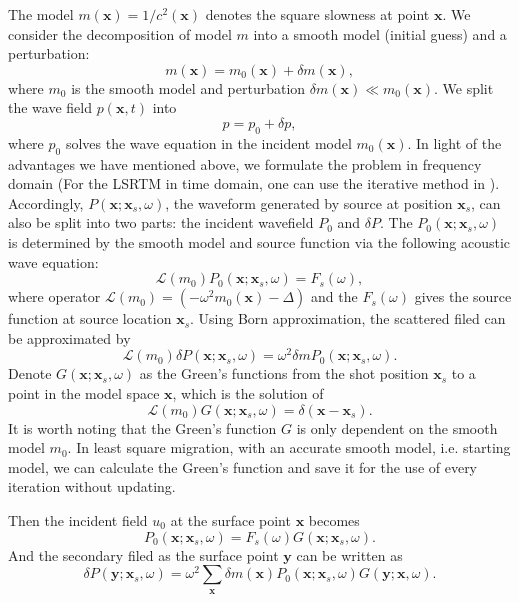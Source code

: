 \documentclass[11pt]{article}
\newcommand{\cL}{\mathcal{L}}
\newcommand{\bx}{\boldsymbol{x}}
\newcommand{\by}{\boldsymbol{y}}
\theoremstyle{plain}
\theoremstyle{definition}
\theoremstyle{remark}
\numberwithin{equation}{section}
\begin{document}
The model $m(\bx)=1/c^2(\bx)$ denotes the square slowness at point $\bx$. 
We consider the decomposition of model $m$ into a smooth model (initial guess) and a perturbation:
\begin{equation}
m(\bx)=m_0(\bx)+\delta m(\bx),
\end{equation} 
where $m_0$ is the smooth model and perturbation $\delta m(\bx) \ll m_0(\bx)$. We split the wave field $p(\bx,t)$ into 
\begin{equation}
p=p_0+\delta p,
\end{equation}
where $p_0$ solves the wave equation in the incident model $m_0(\bx)$.
In light of the advantages we have mentioned above, we formulate the problem in frequency domain (For the LSRTM in time domain, one can use the iterative method in \cite{Dong:2012aa}).
Accordingly, $P(\bx;\bx_s, \omega)$, the waveform generated by source at position $\bx_s$, can also be split into two parts: the incident wavefield $P_0$
and $\delta P$. The $P_0(\bx; \bx_s, \omega)$ is determined by the smooth model and source function via the following acoustic wave equation:
\begin{equation}
\cL( m_0) P_0(\bx; \bx_s, \omega)=F_s(\omega),
\end{equation} 
where operator $\cL( m_0)=(-\omega^2 m_0(\bx)-\Delta)$ and the $F_s(\omega)$ gives the source function at source location $\bx_s$. 
Using Born approximation, the scattered filed can be approximated by  
\begin{equation}
\cL( m_0)\delta P(\bx;\bx_s,\omega) =\omega^2 \delta m P_0(\bx;\bx_s,\omega).
\end{equation}
Denote $G(\bx; \bx_s, \omega)$ as the Green's functions from the shot position $\bx_s$ to a point in the model space $\bx$, which is the solution of 
\begin{equation}
\cL(m_0)G(\bx;\bx_s,\omega)=\delta(\bx-\bx_s).
\end{equation}
It is worth noting that the Green's function $G$ is only dependent on the smooth model 
$m_0$. In least square migration, with an accurate smooth model, i.e. starting model, we can calculate the Green's function and save it for the use of every iteration without updating. 
  
Then the incident field $u_0$ at the surface point $\bx$ becomes
\begin{equation}
P_0(\bx; \bx_s,\omega)=F_s(\omega)G(\bx; \bx_s,\omega).
\end{equation}
And the secondary filed as the surface point $\by$ can be written as 
\begin{equation}
\delta P(\by; \bx_s,\omega)=\omega^2 \sum_{\bx}  \delta m(\bx) P_0(\bx;\bx_s,\omega) G(\by;\bx,\omega).
\end{equation}
\end{document}
